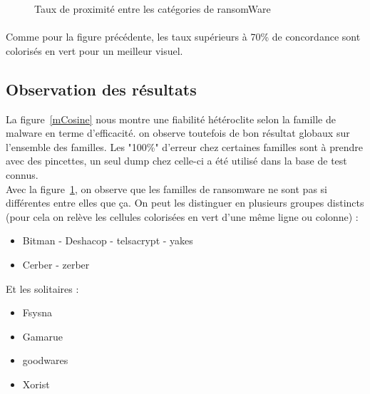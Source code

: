 \documentclass[a4paper, 12pt]{book}
\begin{document}
\begin{figure}[!h]
\caption{Taux de proximité entre les catégories de ransomWare}
\label{proxRansomware}
\end{figure}

\paragraph{}
Comme pour la figure précédente, les taux supérieurs à 70\% de concordance sont colorisés en vert pour un meilleur visuel.

\subsection{Observation des résultats}

La figure~\ref{mCosine} nous montre une fiabilité hétéroclite selon la famille de malware en terme d'efficacité. on observe toutefois de bon résultat globaux sur l’ensemble des familles. Les "100\%" d'erreur chez certaines familles sont à prendre avec des pincettes, un seul dump chez celle-ci a été utilisé dans la base de test connus. 
\\

Avec la figure~\ref{proxRansomware}, on observe que les familles de ransomware ne sont pas si différentes entre elles que ça. On peut les distinguer en plusieurs groupes distincts (pour cela on relève les cellules colorisées en vert d'une même ligne ou colonne) :
\\
	\begin{itemize}
    \item  Bitman - Deshacop - telsacrypt - yakes
    \item  Cerber - zerber
    \end{itemize}
    Et les solitaires :
    \begin{itemize}
    \item Fsysna
    \item Gamarue
    \item goodwares
    \item Xorist
    \end{itemize}
\newpage
\end{document}
